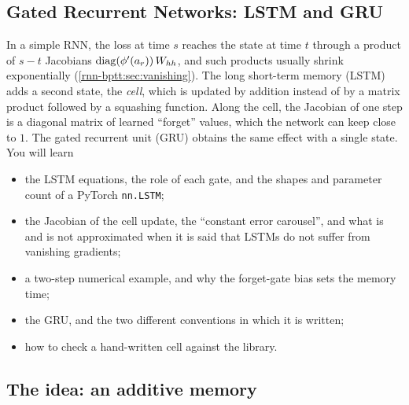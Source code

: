 \begin{notechapter}
\chapter{Gated Recurrent Networks: LSTM and GRU}\label{ch:gated-rnn}

\begin{chapterintro}
In a simple RNN, the loss at time $s$ reaches the state at time $t$ through a product of $s - t$
Jacobians $\operatorname{diag}(\phi'(a_r))\,W_{hh}$, and such products usually shrink exponentially
(\cref{rnn-bptt:sec:vanishing}). The long short-term memory (LSTM) adds a second state, the
\emph{cell}, which is updated by addition instead of by a matrix product followed by a
squashing function. Along the cell, the Jacobian of one step is a diagonal matrix of
learned ``forget'' values, which the network can keep close to $1$. The gated recurrent unit (GRU)
obtains the same effect with a single state. You will learn
\begin{itemize}[nosep]
  \item the LSTM equations, the role of each gate, and the shapes and parameter count of
        a PyTorch \texttt{nn.LSTM};
  \item the Jacobian of the cell update, the ``constant error carousel'', and what is
        and is not approximated when it is said that LSTMs do not suffer from vanishing
        gradients;
  \item a two-step numerical example, and why the forget-gate bias sets the memory time;
  \item the GRU, and the two different conventions in which it is written;
  \item how to check a hand-written cell against the library.
\end{itemize}
\end{chapterintro}

\section{The idea: an additive memory}\label{gated-rnn:sec:idea}


\end{notechapter}
